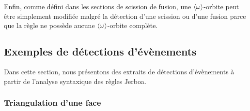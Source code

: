 Enfin, comme défini dans les sections de scission de fusion, une
\(\langle\omega\rangle\)-orbite peut être simplement modifiée malgré la détection
d'une scission ou d'une fusion parce que la règle ne possède aucune
\(\langle\omega\rangle\)-orbite complète. %

\subsection{Exemples de détections d'évènements}

Dans cette section, nous présentons des extraits de détections d'évènements à partir de l'analyse syntaxique des règles Jerboa.

\subsubsection*{Triangulation d'une face}


